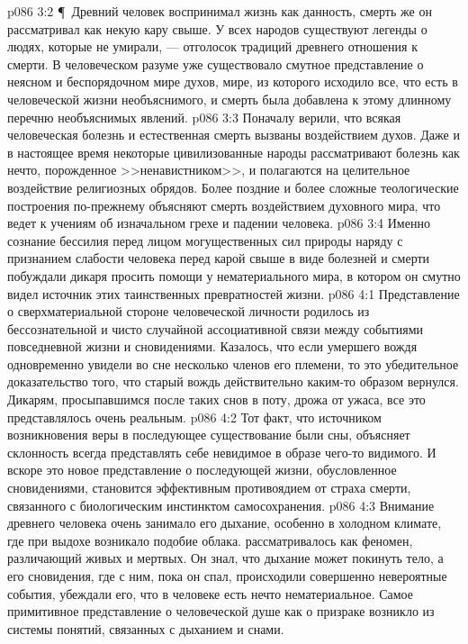 \vs p086 3:2 \P\ Древний человек воспринимал жизнь как данность, смерть же он рассматривал как некую кару свыше. У всех народов существуют легенды о людях, которые не умирали, --- отголосок традиций древнего отношения к смерти. В человеческом разуме уже существовало смутное представление о неясном и беспорядочном мире духов, мире, из которого исходило все, что есть в человеческой жизни необъяснимого, и смерть была добавлена к этому длинному перечню необъяснимых явлений.
\vs p086 3:3 Поначалу верили, что всякая человеческая болезнь и естественная смерть вызваны воздействием духов. Даже и в настоящее время некоторые цивилизованные народы рассматривают болезнь как нечто, порожденное >>ненавистником>>, и полагаются на целительное воздействие религиозных обрядов. Более поздние и более сложные теологические построения по\hyp{}прежнему объясняют смерть воздействием духовного мира, что ведет к учениям об изначальном грехе и падении человека.
\vs p086 3:4 Именно сознание бессилия перед лицом могущественных сил природы наряду с признанием слабости человека перед карой свыше в виде болезней и смерти побуждали дикаря просить помощи у нематериального мира, в котором он смутно видел источник этих таинственных превратностей жизни.
\vs p086 4:1 Представление о сверхматериальной стороне человеческой личности родилось из бессознательной и чисто случайной ассоциативной связи между событиями повседневной жизни и сновидениями. Казалось, что если умершего вождя одновременно увидели во сне несколько членов его племени, то это убедительное доказательство того, что старый вождь действительно каким\hyp{}то образом вернулся. Дикарям, просыпавшимся после таких снов в поту, дрожа от ужаса, все это представлялось очень реальным.
\vs p086 4:2 Тот факт, что источником возникновения веры в последующее существование были сны, объясняет склонность всегда представлять себе невидимое в образе чего\hyp{}то видимого. И вскоре это новое представление о последующей жизни, обусловленное сновидениями, становится эффективным противоядием от страха смерти, связанного с биологическим инстинктом самосохранения.
\vs p086 4:3 Внимание древнего человека очень занимало его дыхание, особенно в холодном климате, где при выдохе возникало подобие облака.  рассматривалось как феномен, различающий живых и мертвых. Он знал, что дыхание может покинуть тело, а его сновидения, где с ним, пока он спал, происходили совершенно невероятные события, убеждали его, что в человеке есть нечто нематериальное. Самое примитивное представление о человеческой душе как о призраке возникло из системы понятий, связанных с дыханием и снами.
